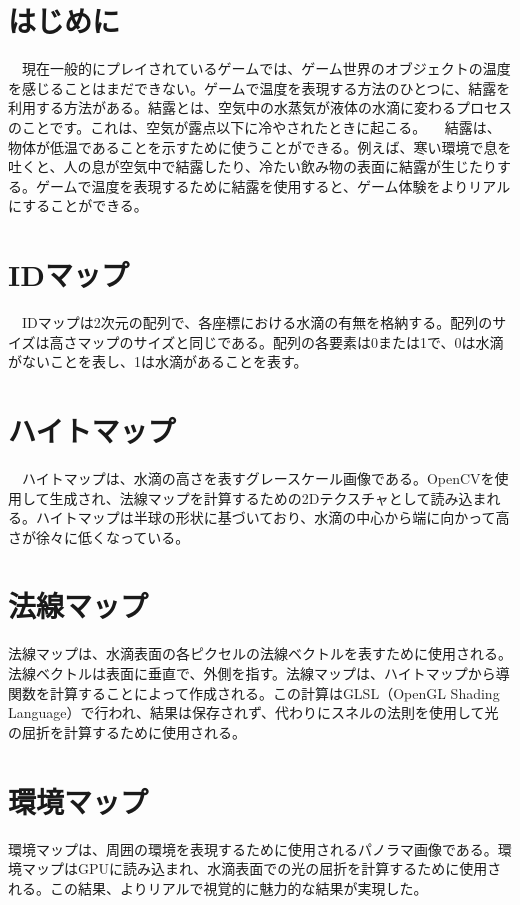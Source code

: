 \documentclass[dvipdfmx,uplatex,11pt]{jabstract}
\begin{document}
\maketitle

\begin{multicols}{2}
  
\section{はじめに}
　現在一般的にプレイされているゲームでは、ゲーム世界のオブジェクトの温度を感じることはまだできない。ゲームで温度を表現する方法のひとつに、結露を利用する方法がある。結露とは、空気中の水蒸気が液体の水滴に変わるプロセスのことです。これは、空気が露点以下に冷やされたときに起こる。
　結露は、物体が低温であることを示すために使うことができる。例えば、寒い環境で息を吐くと、人の息が空気中で結露したり、冷たい飲み物の表面に結露が生じたりする。ゲームで温度を表現するために結露を使用すると、ゲーム体験をよりリアルにすることができる。

\section{IDマップ}
　IDマップは2次元の配列で、各座標における水滴の有無を格納する。配列のサイズは高さマップのサイズと同じである。配列の各要素は0または1で、0は水滴がないことを表し、1は水滴があることを表す。

\section{ハイトマップ}
　ハイトマップは、水滴の高さを表すグレースケール画像である。OpenCVを使用して生成され、法線マップを計算するための2Dテクスチャとして読み込まれる。ハイトマップは半球の形状に基づいており、水滴の中心から端に向かって高さが徐々に低くなっている。

\section{法線マップ}
法線マップは、水滴表面の各ピクセルの法線ベクトルを表すために使用される。法線ベクトルは表面に垂直で、外側を指す。法線マップは、ハイトマップから導関数を計算することによって作成される。この計算はGLSL（OpenGL Shading Language）で行われ、結果は保存されず、代わりにスネルの法則を使用して光の屈折を計算するために使用される。

\section{環境マップ}
環境マップは、周囲の環境を表現するために使用されるパノラマ画像である。環境マップはGPUに読み込まれ、水滴表面での光の屈折を計算するために使用される。この結果、よりリアルで視覚的に魅力的な結果が実現した。


\end{multicols}
\end{document}
